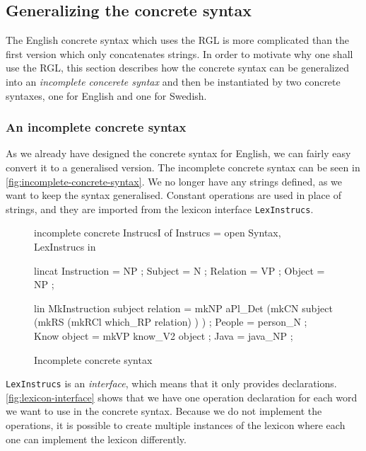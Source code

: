 \subsection{Generalizing the concrete syntax}

The English concrete syntax which uses the \ac{RGL} is more complicated than the first version which only concatenates strings. In order to motivate why one shall use the RGL, this section describes how the concrete syntax can be generalized into an \emph{incomplete concerete syntax} and then be instantiated by two concrete syntaxes, one for English and one for Swedish.

\subsubsection*{An incomplete concrete syntax}

As we already have designed the concrete syntax for English, we can fairly easy convert it to a generalised version. The incomplete concrete syntax can be seen in \autoref{fig:incomplete-concrete-syntax}. We no longer have any strings defined, as we want to keep the syntax generalised. Constant operations are used in place of strings, and they are imported from the lexicon interface  \texttt{LexInstrucs}.

\begin{figure}[h]
\begin{code}
incomplete concrete InstrucsI of Instrucs = open Syntax, LexInstrucs in {
    lincat
      Instruction = NP ;
      Subject = N ;
      Relation = VP ;
      Object = NP ;

    lin
      MkInstruction subject relation = mkNP aPl_Det 
                                        (mkCN subject 
                                            (mkRS 
                                                (mkRCl which_RP relation)
                                            )
                                        ) ;
      People = person_N ;
      Know object = mkVP know_V2 object ;
      Java = java_NP ;
}
\end{code}
\caption{Incomplete concrete syntax\label{fig:incomplete-concrete-syntax}}
\end{figure}

\texttt{LexInstrucs} is an \emph{interface}, which means that it only provides declarations. \autoref{fig:lexicon-interface} shows that we have one operation declaration for each word we want to use in the concrete syntax. Because we do not implement the operations, it is possible to create multiple instances of the lexicon where each one can implement the lexicon differently.

